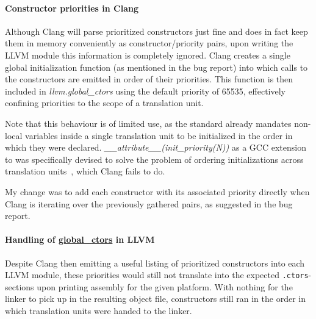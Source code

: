 \paragraph{Constructor priorities in Clang}

Although Clang will parse prioritized constructors just fine and does in fact
keep them in memory conveniently as constructor/priority pairs, upon writing
the LLVM module this information is completely ignored. Clang creates a single
global initialization function (as mentioned in the bug report) into which
calls to the constructors are emitted in order of their priorities. This
function is then included in \emph{llvm.global\_ctors} using the default
priority of 65535, effectively confining priorities to the scope of
a translation unit.

\begin{framed}

Note that this behaviour is of limited use, as the \CPP standard already
mandates non-local variables inside a single translation unit to be initialized
in the order in which they were declared.
\emph{\_\_attribute\_\_(init\_priority(N))} as a GCC extension to \CPP was
specifically devised to solve the problem of ordering initializations across
translation units~\cite{gcc-initpriority}, which Clang fails to do.


\end{framed}

My change was to add each constructor with its associated priority directly
when Clang is iterating over the previously gathered pairs, as suggested in the
bug report.


\paragraph{Handling of \url{global\_ctors} in LLVM}

Despite Clang then emitting a useful listing of prioritized constructors into
each LLVM module, these priorities would still not translate into the expected
\texttt{.ctors}-sections upon printing assembly for the given platform.  With
nothing for the linker to pick up in the
resulting object file, constructors still ran in the order in which translation
units were handed to the linker.

